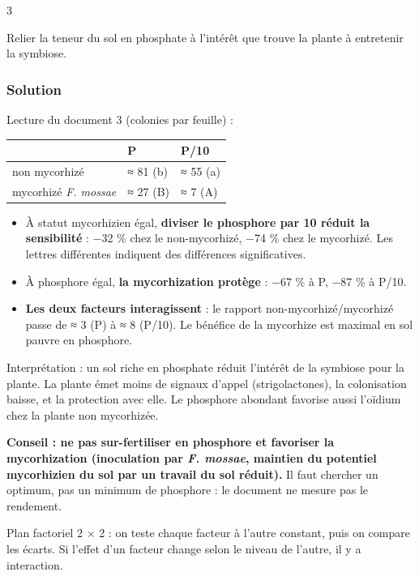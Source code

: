 \documentclass[11pt,a4paper]{article}
\providecommand{\tightlist}{\setlength{\itemsep}{0pt}\setlength{\parskip}{0pt}}
\begin{document}
\begin{indication}{3}

Relier la teneur du sol en phosphate à l'intérêt que trouve la plante à entretenir la symbiose.

\end{indication}

\hypertarget{solution-7}{%
\subsubsection{Solution}\label{solution-7}}

Lecture du document 3 (colonies par feuille) :

\begin{longtable}[]{@{}lll@{}}
\toprule\noalign{}
& P & P/10 \\
\midrule\noalign{}
\endhead
\bottomrule\noalign{}
\endlastfoot
non mycorhizé & ≈ 81 (b) & ≈ 55 (a) \\
mycorhizé \emph{F. mossae} & ≈ 27 (B) & ≈ 7 (A) \\
\end{longtable}

\begin{itemize}
\tightlist
\item
  À statut mycorhizien égal, \textbf{diviser le phosphore par 10 réduit la sensibilité} : −32 \% chez le non-mycorhizé, −74 \% chez le mycorhizé. Les lettres différentes indiquent des différences significatives.
\item
  À phosphore égal, \textbf{la mycorhization protège} : −67 \% à P, −87 \% à P/10.
\item
  \textbf{Les deux facteurs interagissent} : le rapport non-mycorhizé/mycorhizé passe de ≈ 3 (P) à ≈ 8 (P/10). Le bénéfice de la mycorhize est maximal en sol pauvre en phosphore.
\end{itemize}

Interprétation : un sol riche en phosphate réduit l'intérêt de la symbiose pour la plante. La plante émet moins de signaux d'appel (strigolactones), la colonisation baisse, et la protection avec elle. Le phosphore abondant favorise aussi l'oïdium chez la plante non mycorhizée.

\textbf{Conseil : ne pas sur-fertiliser en phosphore et favoriser la mycorhization (inoculation par \emph{F. mossae}, maintien du potentiel mycorhizien du sol par un travail du sol réduit).} Il faut chercher un optimum, pas un minimum de phosphore : le document ne mesure pas le rendement.

\begin{methode}

Plan factoriel 2 × 2 : on teste chaque facteur à l'autre constant, puis on compare les écarts. Si l'effet d'un facteur change selon le niveau de l'autre, il y a interaction.

\end{methode}
\end{document}

